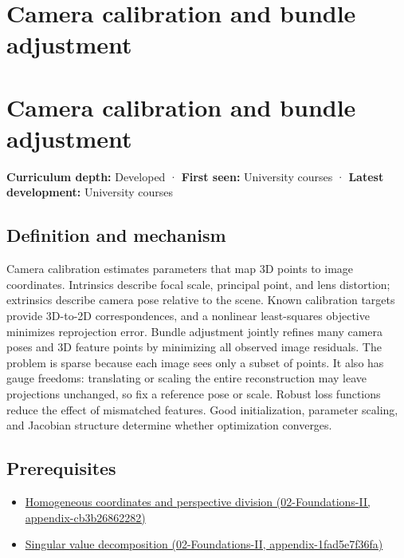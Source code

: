 \hypertarget{appendix-3ee9861904d5}{}
\section*{Camera calibration and bundle adjustment}
\section{Camera calibration and bundle adjustment}\label{appendix-3ee9861904d5-camera-calibration-and-bundle-adjustment}

\textbf{Curriculum depth:} Developed · \textbf{First seen:} University courses · \textbf{Latest development:} University courses

\subsection{Definition and mechanism}\label{appendix-3ee9861904d5-definition-and-mechanism}

Camera calibration estimates parameters that map 3D points to image coordinates. Intrinsics describe focal scale, principal point, and lens distortion; extrinsics describe camera pose relative to the scene. Known calibration targets provide 3D-to-2D correspondences, and a nonlinear least-squares objective minimizes reprojection error. Bundle adjustment jointly refines many camera poses and 3D feature points by minimizing all observed image residuals. The problem is sparse because each image sees only a subset of points. It also has gauge freedoms: translating or scaling the entire reconstruction may leave projections unchanged, so fix a reference pose or scale. Robust loss functions reduce the effect of mismatched features. Good initialization, parameter scaling, and Jacobian structure determine whether optimization converges.

\subsection{Prerequisites}\label{appendix-3ee9861904d5-prerequisites}

\begin{itemize}
\tightlist
\item
  \href{../02-Foundations-II/main.pdf\#nameddest=appendix-cb3b26862282}{Homogeneous coordinates and perspective division (02-Foundations-II, appendix-cb3b26862282)}
\item
  \href{../02-Foundations-II/main.pdf\#nameddest=appendix-1fad5e7f36fa}{Singular value decomposition (02-Foundations-II, appendix-1fad5e7f36fa)}
\end{itemize}

